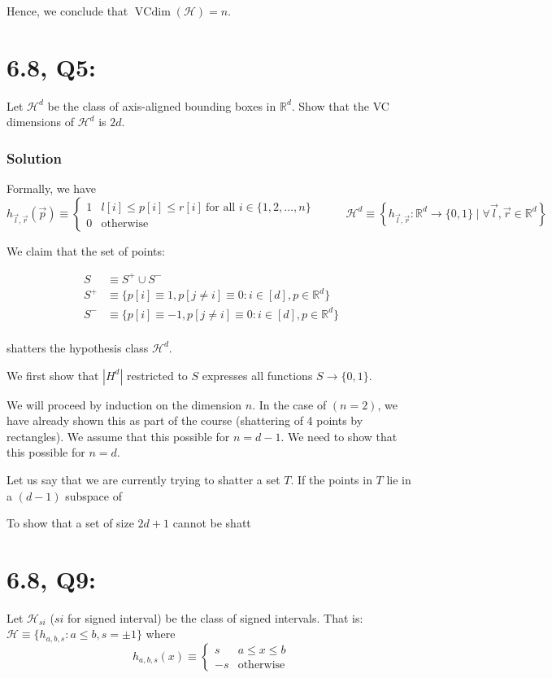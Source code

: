 \documentclass[11pt]{article}
\newcommand{\R}{\ensuremath{\mathbb R}}
\renewcommand{\H}{\ensuremath{\mathcal{H}}}
\DeclareMathOperator{\vcdim}{VCdim}
\newcommand{\vc}{\ensuremath{\vcdim}}
\begin{document}
Hence, we conclude that $\vc(\H) = n$.

\section*{6.8, Q5:}
Let $\H^d$ be the class of axis-aligned bounding boxes in $\R^d$. Show that
the VC dimensions of $\H^d$ is $2d$.


\subsubsection*{Solution}
Formally, we have 
$$
h_{\vec l, \vec r}(\vec p) \equiv
\begin{cases}
1 &  l[i] \leq p[i] \leq r[i]~\text{for all $i \in \{1, 2, \dots, n \}$ } \\
0 & \text{otherwise}
\end{cases} \qquad
\H^d \equiv \left\{ h_{\vec l, \vec r}: \R^d \rightarrow \{0, 1\} \mid \forall \vec l, \vec r \in \mathbb R^d \right\}
$$

We claim that the set of points:

\begin{align*}
S &\equiv S^+ \cup S^- \\
S^+ &\equiv \{ p[i] \equiv 1, p[j \neq i] \equiv 0 : i \in [d], p \in \R^d \} \\
S^- &\equiv \{ p[i] \equiv -1, p[j \neq i] \equiv 0 : i \in [d], p \in \R^d  \} \\
\end{align*}

shatters the hypothesis class $\H^d$.

We first show that $|H^d|$ restricted to $S$ expresses all functions $S \rightarrow \{0, 1\}$.

We will proceed by induction on the dimension $n$.
In the case of $(n = 2)$, we have already shown
this as part of the course (shattering of 4 points by rectangles). We assume that this
possible for $n=d-1$. We need to show that this possible for $n = d$.

Let us say that we are currently trying to shatter a set $T$. If the points
in $T$ lie in a $(d-1)$ subspace of 


To show that a set of size $2d+1$ cannot be shatt

\section*{6.8, Q9:}
Let $\H_{si}$ ($si$ for signed interval) be the class of signed intervals.
That is: $\H \equiv \{ h_{a, b, s} : a \leq b, s = \pm 1 \}$
where 
$$
h_{a, b, s}(x) \equiv
\begin{cases}
    s & a \leq x \leq b \\
    -s & \text{otherwise}
\end{cases}
$$
\end{document}

